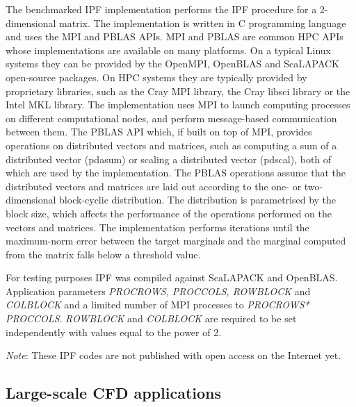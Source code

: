 The benchmarked IPF implementation performs the IPF procedure for a 2-dimensional matrix.
The implementation is written in C programming language and uses the MPI and PBLAS APIs. MPI and PBLAS are common HPC APIs whose implementations are available on many platforms. On a typical Linux systems they can be provided by the OpenMPI, OpenBLAS and \textsf{ScaLAPACK} open-source packages. On HPC systems they are typically provided by proprietary libraries, such as the Cray MPI library, the Cray libsci library or the Intel MKL library.
The implementation uses MPI to launch computing processes on different computational nodes, and perform message-based communication between them. The PBLAS API which, if built on top of MPI, provides operations on distributed vectors and matrices, such as computing a sum of a distributed vector (pdasum) or scaling a distributed vector (pdscal), both of which are used by the implementation.
The PBLAS operations assume that the distributed vectors and matrices are laid out according to the one- or two-dimensional block-cyclic distribution. The distribution is parametrised by the block size, which affects the performance of the operations performed on the vectors and matrices.
The implementation performs iterations until the maximum-norm error between the target marginals and the marginal computed from the matrix falls below a threshold value.

For testing purposes IPF was compiled against \textsf{ScaLAPACK} and OpenBLAS. 
Application parameters \textit{PROCROWS, PROCCOLS, ROWBLOCK} and \textit{COLBLOCK}  and a limited number of MPI processes to \textit{PROCROWS* PROCCOLS}. \textit{ROWBLOCK} and \textit{COLBLOCK} are required to be set independently with values equal to the power of 2.

\fi

\textit{Note}: These IPF codes are not published with open access on the Internet yet.

\subsection{Large-scale CFD applications}

